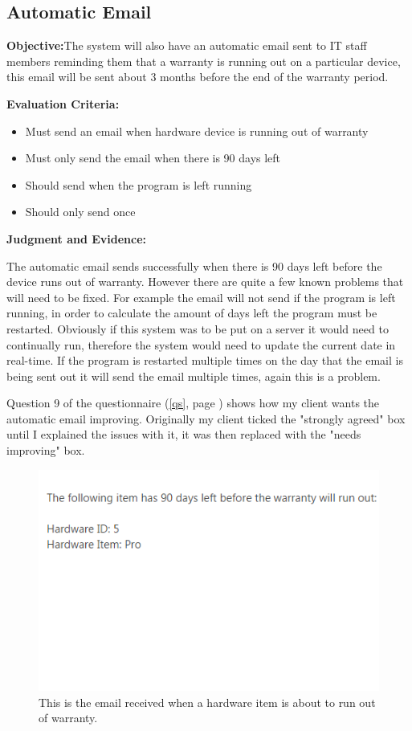 \subsection{Automatic Email}

\textbf{Objective:}The system will also have an automatic email sent to IT staff members reminding them that a warranty is running out on a particular device, this email will be sent about 3 months before the end of the warranty period.

\textbf{Evaluation Criteria:}
\begin{itemize}
\item{Must send an email when hardware device is running out of warranty}
\item{Must only send the email when there is 90 days left}
\item{Should send when the program is left running}
\item{Should only send once}
\end{itemize}

\textbf{Judgment and Evidence:}

The automatic email sends successfully when there is 90 days left before the device runs out of warranty. However there are quite a few known problems that will need to be fixed. For example the email will not send if the program is left running, in order to calculate the amount of days left the program must be restarted. Obviously if this system was to be put on a server it would need to continually run, therefore the system would need to update the current date in real-time. If the program is restarted multiple times on the day that the email is being sent out it will send the email multiple times, again this is a problem.

Question 9 of the questionnaire (\ref{qs}, page \pageref{qs}) shows how my client wants the automatic email improving. Originally my client ticked the "strongly agreed" box until I explained the issues with it, it was then replaced with the "needs improving" box.

\begin{figure}[H]
    \includegraphics[width=\textwidth]{./Testing/Images/EmailExpiredHardware.png}
    \caption{This is the email received when a hardware item is about to run out of warranty.} 
\end{figure}

